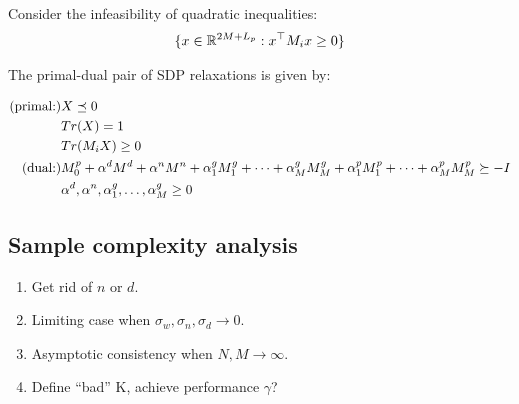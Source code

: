 \documentclass[11pt, onecolumn]{article}
\theoremstyle{plain}
\theoremstyle{plain}
\theoremstyle{definition}
\begin{document}
Consider the infeasibility  of quadratic inequalities:
\begin{align*}
  \{x\in\mathbb R^{2M + L_p} : x^\top M_i x \ge 0 \}
\end{align*}

The primal-dual pair of SDP relaxations is given by:

\begin{align*}
  \text{(primal:)} & X\preceq 0
  \\
  & Tr(X) = 1
  \\
  & Tr(M_i X)\ge 0
  \\
  \text{(dual:)} & M_0^p + \alpha^d M^d + \alpha^n M^n + \alpha^g_1 M^g_1 + \dots+ \alpha^g_M M^g_M +
  \alpha^p_1 M^p_1 +\dots + \alpha^p_M M^p_M \succeq -I
  \\
  & \alpha^d, \alpha^n,\alpha^g_1,\dots, \alpha^g_M\ge 0
\end{align*}




\subsection{Sample complexity analysis}

\begin{enumerate}
\item Get rid of $n$ or $d$.
\item Limiting case when $\sigma_w, \sigma_n,\sigma_d\to 0$.
\item Asymptotic consistency when $N,M\to \infty$.
\item Define ``bad'' K, achieve performance $\gamma$?
\end{enumerate}
\end{document}
